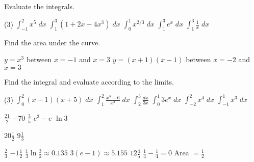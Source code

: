 \clearpage
\begin{Exercise}[title={Area},label=exArea]
	\Question Evaluate the integrals. 
	\begin{tasks}(3)
		\task  $\int _{ -1}^{2}x^{5}\; d x$ %
		\task $\int _{1}^{3}\left (1 +2 x -4 x^{3}\right )\; d x$ %
		\task $\int _{0}^{1}x^{2/3}\; d x$ %
		\task $\int _{1}^{3}e^{x}\; d x$ %
		\task $\int _{1}^{3}\frac{1}{x}\; d x$ %
	\end{tasks}
	
	\Question Find the area under the curve.
	\begin{tasks}
		\task $y =x^{3}$ between $x = -1$ and $x =3$ %
		\task $y =\left (x +1\right ) \left (x -1\right )$ between $x = -2$ and $x =3$ %
	\end{tasks}
	
	\Question Find the integral and evaluate according to the limits.
	\begin{tasks}(3)
		\task $\int _{0}^{2}\left (x -1\right ) \left (x +5\right )\; d x$ %
		\task $\int _{1}^{2}\frac{x^{3} -6}{x^{2}}\; d x$  %
		\task $\int _{2}^{3}\frac{d x}{3 x}$ %
		\task $\int _{0}^{1}3 e^{x}\; d x$ %
		\task $\int _{ -2}^{2}x^{4}\; d x$  %
		\task $\int _{ -1}^{1}x^{3}\; d x$ %
	\end{tasks}
\end{Exercise}
\begin{Answer}[ref={exArea}]
	\Question %
\begin{tasks}
	\task $\frac{21}{2}$
	\task $ -70$ 
	\task $\frac{3}{5}$
	\task $e^{3} -e$ 
	\task $\ln  3$ 
\end{tasks}

\Question %
\begin{tasks}
	\task $20\frac{1}{2}$
	\task $9\frac{1}{3}$
\end{tasks}

\Question %
\begin{tasks}
	\task $\frac{2}{3}$
	\task $ -1\frac{1}{2}$ 
	\task $\frac{1}{3} \ln  \frac{3}{2} \approx 0.135$
	\task $3 \left (e -1\right ) \approx 5.155$
	\task $12\frac{4}{5}$ 
	\task $\frac{1}{4} -\frac{1}{4} =0$ Area $ =\frac{1}{2}$
\end{tasks}
\end{Answer}%

